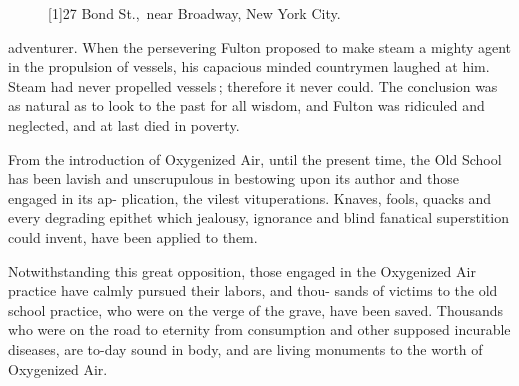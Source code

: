 \documentclass[10pt]{article}
\begin{document}
\begin{multicols}{3}
\begin{figure}
		\vspace{3mm}

		\hspace{-8mm}\scalebox{1.15}[1]{27 Bond St.,\ near Broadway, New York City.}
	\end{figure}
	adventurer. When the persevering Fulton\linebreak
	proposed to make steam a mighty agent in\linebreak
	the propulsion of vessels, his capacious minded\linebreak
	countrymen laughed at him. Steam had\linebreak
	never propelled vessels\,; therefore it never\linebreak
	could. The conclusion was as natural as to\linebreak
	look to the past for all wisdom, and Fulton\linebreak
	was ridiculed and neglected, and at last died\linebreak
	in poverty.

	From the introduction of Oxygenized Air,\linebreak
	until the present time, the Old School has\linebreak
	been lavish and unscrupulous in bestowing\linebreak
	upon its author and those engaged in its ap-\linebreak
	plication, the vilest vituperations. Knaves,\linebreak
	fools, quacks and every degrading epithet\linebreak
	which jealousy, ignorance and blind fanatical\linebreak
	superstition could invent, have been applied\linebreak
	to them.

	Notwithstanding this great opposition,\linebreak
	those engaged in the Oxygenized Air practice\linebreak
	have calmly pursued their labors, and thou-\linebreak
	sands of victims to the old school practice,\linebreak
	who were on the verge of the grave, have been\linebreak
	saved. Thousands who were on the road to\linebreak
	eternity from consumption and other supposed\linebreak
	incurable diseases, are to-day sound in body,\linebreak
	and are living monuments to the worth of\linebreak
	Oxygenized Air.


\end{multicols}
\end{document}
